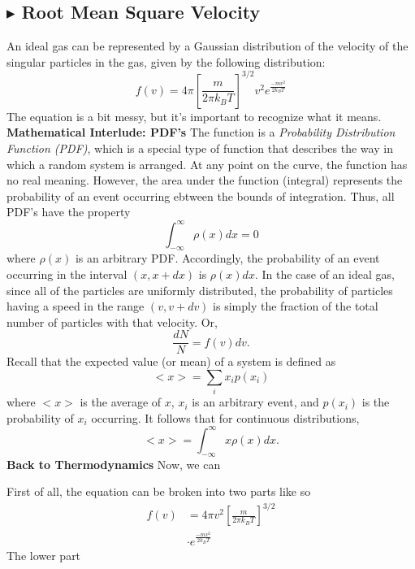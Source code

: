 \subsection{\color{Orchid} $\blacktriangleright$ \color{black} Root Mean Square Velocity}
An ideal gas can be represented by a Gaussian distribution of the velocity of the singular particles in the gas, given by the following distribution:
\begin{equation}
    f(v) = 4\pi\left[\frac{m}{2\pi k_BT}\right]^{3/2}v^2e^{\frac{-mv^2}{2k_BT}}
\end{equation}
\noindent The equation is a bit messy, but it's important to recognize what it means. 
\textbf{Mathematical Interlude: PDF's}
\noindent The function is a \textit{Probability Distribution Function (PDF)}, which is a special type of function that describes the way in which a random system is arranged. At any point on the curve, the function has no real meaning. However, the area under the function (integral) represents the probability of an event occurring ebtween the bounds of integration. Thus, all PDF's have the property
\begin{equation}
    \int_{-\infty}^{\infty} \rho(x) dx = 0
\end{equation}
\noindent where $\rho(x)$ is an arbitrary PDF. Accordingly, the probability of an event occurring in the interval $(x,x+dx)$ is $\rho(x) dx$. In the case of an ideal gas, since all of the particles are uniformly distributed, the probability of particles having a speed in the range $(v,v+dv)$ is simply the fraction of the total number of particles with that velocity. Or,
\begin{equation}
    \frac{dN}{N} = f(v) dv.
\end{equation}
\noindent Recall that the expected value (or mean) of a system is defined as
\begin{equation*}
    <x> = \sum_i x_i p(x_i)
\end{equation*}
\noindent where $<x>$ is the average of $x$, $x_i$ is an arbitrary event, and $p(x_i)$ is the probability of $x_i$ occurring. It follows that for continuous distributions, 
\begin{equation}
    <x> = \int_{-\infty}^{\infty} x \rho(x) dx.
\end{equation}
\textbf{Back to Thermodynamics}
\noindent Now, we can 

First of all, the equation can be broken into two parts like so
\begin{align*}
    f(v) &= 4\pi v^2\left[\frac{m}{2\pi k_BT}\right]^{3/2} \\
    &\cdot e^{\frac{-mv^2}{2k_BT}}
\end{align*}
\noindent The lower part 